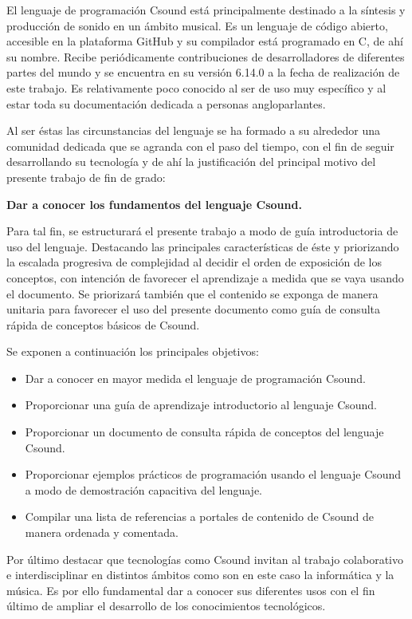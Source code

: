 

El lenguaje de programaci\'on Csound est\'a principalmente destinado a la s\'intesis y producci\'on de sonido en un \'ambito musical.
Es un lenguaje de c\'odigo abierto, accesible en la plataforma GitHub y su compilador está programado en C, de ahí su nombre.
Recibe peri\'odicamente contribuciones de desarrolladores de diferentes partes del mundo y se encuentra en su versi\'on 6.14.0 a la fecha de realizaci\'on de este trabajo.
Es relativamente poco conocido al ser de uso muy específico y al estar toda su documentación dedicada a personas angloparlantes.

Al ser \'estas las circunstancias del lenguaje se ha formado a su alrededor una comunidad dedicada que se agranda con el paso del tiempo, con el fin de seguir desarrollando su tecnología y 
de ahí la justificación del principal motivo del presente trabajo de fin de grado: \bigskip

\begin{center}
\textbf{Dar a conocer los fundamentos del lenguaje Csound.}\bigskip
\end{center}

Para tal fin, se estructurará el presente trabajo a modo de guía introductoria de uso del lenguaje. Destacando las principales características de éste y priorizando la escalada progresiva de 
complejidad al decidir el orden de exposición de los conceptos, con intención de favorecer el aprendizaje a medida que se vaya usando el documento. Se priorizará también que el contenido se exponga de manera unitaria 
para favorecer el uso del presente documento como guía de consulta rápida de conceptos básicos de Csound.\bigskip

Se exponen a continuación los principales objetivos: 
\begin{itemize}
\item Dar a conocer en mayor medida el lenguaje de programación Csound.
\item Proporcionar una guía de aprendizaje introductorio al lenguaje Csound.
\item Proporcionar un documento de consulta rápida de conceptos del lenguaje Csound.
\item Proporcionar ejemplos prácticos de programación usando el lenguaje Csound a modo de demostración capacitiva del lenguaje.
\item Compilar una lista de referencias a portales de contenido de Csound de manera ordenada y comentada.
\end{itemize}

Por último destacar que tecnologías como Csound invitan al trabajo colaborativo e interdisciplinar en distintos ámbitos como son en este caso la informática y la música. Es por ello fundamental dar a conocer sus diferentes usos con el fin último de ampliar 
el desarrollo de los conocimientos tecnológicos.


